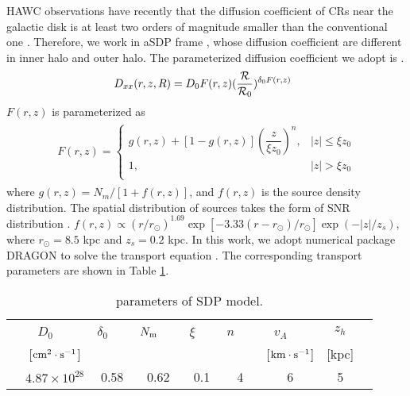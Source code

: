 \documentclass[a4paper,11pt]{article}
\begin{document}
HAWC observations have recently that the diffusion coefficient of CRs near the galactic disk is at least two orders of magnitude smaller than the conventional one \citep{2017Sci...358..911A}.
Therefore, we work in aSDP frame \citep {2012ApJ...752L..13T, 2016ApJ...819...54G, 2016ChPhC..40a5101J}, whose diffusion coefficient are different in inner halo and outer halo. The parameterized diffusion coefficient we adopt is  \citep {2018PhRvD..97f3008G, 2018ApJ...869..176L}.
\begin{align}
\ D_{xx}( r,z,R) &=
D_0F(r,z)({\dfrac{\cal R}{ {\cal R}_0}})^{{\delta_0}F(r,z)}
\label{eq:D_{xx}}
\end{align}
$F(r,z)$ is parameterized as
\begin{align}
\begin{split}
F(r,z)= \left \{
\begin{array}{ll}
g(r,z)+[1-g(r,z)]{(\dfrac{z}{ \xi z_0})}^n,       &  |z|\leq\xi z_0 \\
1, & |z|>\xi z_0\\
\end{array}
\right.
\end{split}
\end{align}
where $g(r,z) = N_m/[1+f(r,z)]$, and $f(r,z)$ is the source density
distribution. The spatial
distribution of sources takes the form of SNR distribution
\citep {1996A&AS..120C.437C}. $f(r,z) \propto (r/r_\odot)^{1.69}
\exp[-3.33(r -r_\odot)/r_\odot] \exp(-|z|/z_s)$,
where $r_\odot = 8.5$ kpc and $z_s = 0.2$ kpc. In this work, we adopt numerical package DRAGON to solve the transport equation \citep {2008AIPC.1085..380E}.
The corresponding transport
parameters are shown in Table \ref{tab:transport}. 
\begin{table}
	\begin{center}
		\caption{parameters of SDP model.}
		\begin{tabular}{|ccccccccc|}
			\hline
			& $D_0$~~~    &   $\delta_0$~~~     &    $N_{\rm m}$~~~    &    $\xi$~~~   &    $n$~~~  &    $v_A$~~~    &    $z_h$ &  \\
			& [${\rm cm}^2 \cdot {\rm s}^{-1}$] & & & & & [${\rm km}\cdot{\rm s}^{-1}$] & [kpc]  &\\
			\hline
			& $4.87 \times 10^{28}$  & 0.58  & 0.62    & 0.1   & 4          & 6        &  5    &      \\
			\hline
		\end{tabular}
		\label{tab:transport}
	\end{center}
\end{table}
\end{document}
